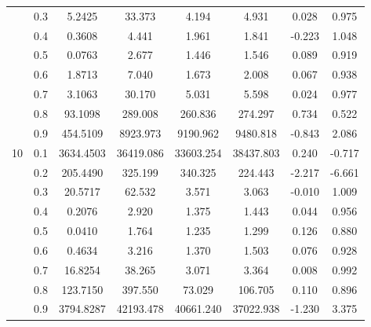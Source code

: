 \documentclass[11pt,a4paper]{report}
\begin{document}
\begin{longtable}{ | c | c || c | c | c | c | c | c | }
 & 0.3 & 5.2425 & 33.373 & 4.194 & 4.931 & 0.028 & 0.975 \\
 & 0.4 & 0.3608 & 4.441 & 1.961 & 1.841 & -0.223 & 1.048 \\
 & 0.5 & 0.0763 & 2.677 & 1.446 & 1.546 & 0.089 & 0.919 \\
 & 0.6 & 1.8713 & 7.040 & 1.673 & 2.008 & 0.067 & 0.938 \\
 & 0.7 & 3.1063 & 30.170 & 5.031 & 5.598 & 0.024 & 0.977 \\
 & 0.8 & 93.1098 & 289.008 & 260.836 & 274.297 & 0.734 & 0.522 \\
 & 0.9 & 454.5109 & 8923.973 & 9190.962 & 9480.818 & -0.843 & 2.086 \\
 \hline
\multirow{9}{*}{10} & 0.1 & 3634.4503 & 36419.086 & 33603.254 & 38437.803 & 0.240 & -0.717 \\
 & 0.2 & 205.4490 & 325.199 & 340.325 & 224.443 & -2.217 & -6.661 \\
 & 0.3 & 20.5717 & 62.532 & 3.571 & 3.063 & -0.010 & 1.009 \\
 & 0.4 & 0.2076 & 2.920 & 1.375 & 1.443 & 0.044 & 0.956 \\
 & 0.5 & 0.0410 & 1.764 & 1.235 & 1.299 & 0.126 & 0.880 \\
 & 0.6 & 0.4634 & 3.216 & 1.370 & 1.503 & 0.076 & 0.928 \\
 & 0.7 & 16.8254 & 38.265 & 3.071 & 3.364 & 0.008 & 0.992 \\
 & 0.8 & 123.7150 & 397.550 & 73.029 & 106.705 & 0.110 & 0.896 \\
 & 0.9 & 3794.8287 & 42193.478 & 40661.240 & 37022.938 & -1.230 & 3.375 \\
 \hline
\hline
\end{longtable}
\end{document}
